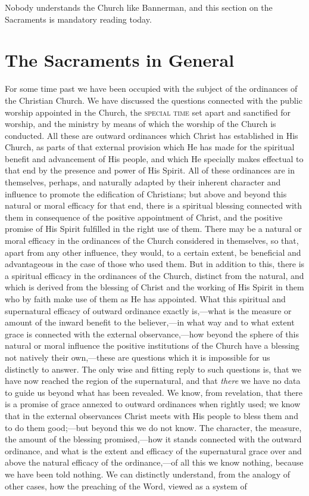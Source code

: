 \documentclass[english,]{book}
\begin{document}
Nobody understands the Church like Bannerman, and this section on the Sacraments is mandatory reading today.

\mainmatter

\hypertarget{the-sacraments-in-general}{%
\chapter{The Sacraments in General}\label{the-sacraments-in-general}}

For some time past we have been occupied with the subject of the ordinances of the Christian Church. We have discussed the questions connected with the public worship appointed in the Church, the \textsc{special time} set apart and sanctified for worship, and the ministry by means of which the worship of the Church is conducted. All these are outward ordinances which Christ has established in His Church, as parts of that external provision which He has made for the spiritual benefit and advancement of His people, and which He specially makes effectual to that end by the presence and power of His Spirit. All of these ordinances are in themselves, perhaps, and naturally adapted by their inherent character and influence to promote the edification of Christians; but above and beyond this natural or moral efficacy for that end, there is a spiritual blessing connected with them in consequence of the positive appointment of Christ, and the positive promise of His Spirit fulfilled in the right use of them. There may be a natural or moral efficacy in the ordinances of the Church considered in themselves, so that, apart from any other influence, they would, to a certain extent, be beneficial and advantageous in the case of those who used them. But in addition to this, there is a spiritual efficacy in the ordinances of the Church, distinct from the natural, and which is derived from the blessing of Christ and the working of His Spirit in them who by faith make use of them as He has appointed. What this spiritual and supernatural efficacy of outward ordinance exactly is,---what is the measure or amount of the inward benefit to the believer,---in what way and to what extent grace is connected with the external observance,---how beyond the sphere of this natural or moral influence the positive institutions of the Church have a blessing not natively their own,---these are questions which it is impossible for us distinctly to answer. The only wise and fitting reply to such questions is, that we have now reached the region of the supernatural, and that \emph{there} we have no data to guide us beyond what has been revealed. We know, from revelation, that there is a promise of grace annexed to outward ordinances when rightly used; we know that in the external observances Christ meets with His people to bless them and to do them good;---but beyond this we do not know. The character, the measure, the amount of the blessing promised,---how it stands connected with the outward ordinance, and what is the extent and efficacy of the supernatural grace over and above the natural efficacy of the ordinance,---of all this we know nothing, because we have been told nothing. We can distinctly understand, from the analogy of other cases, how the preaching of the Word, viewed as a system of 
\end{document}
